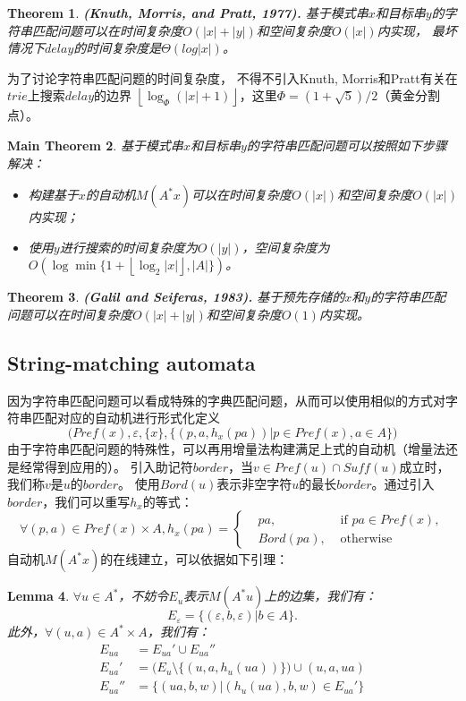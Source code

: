 \documentclass[UTF8]{ctexart}
\newtheorem{thm}{Theorem}[subsection]
\newtheorem{lem}[thm]{Lemma}
\newtheorem{mthm}[thm]{Main Theorem}
\theoremstyle{definition}
\theoremstyle{remark}
\numberwithin{equation}{subsection}
\newcommand\Emph{\textbf}
\newcommand{\resetcounter}{\setcounter{equation}{0}}
\begin{document}
	\begin{thm}
		\Emph{(Knuth, Morris, and Pratt, 1977).} 
		基于模式串$x$和目标串$y$的字符串匹配问题可以在时间复杂度$O(|x|+|y|)$和空间复杂度$O(|x|)$内实现，
		最坏情况下$delay$的时间复杂度是$\Theta(log|x|)$。
	\end{thm}
	为了讨论字符串匹配问题的时间复杂度，
	不得不引入Knuth, Morris和Pratt有关在$trie$上搜索$delay$的边界
	$\left\lfloor \log_\Phi(|x|+1) \right\rfloor$，这里$\Phi = (1+\sqrt5)/2$（黄金分割点）。
	
	\begin{mthm}
		基于模式串$x$和目标串$y$的字符串匹配问题可以按照如下步骤解决：
		\begin{itemize}
			\item 构建基于$x$的自动机$M(A^*x)$可以在时间复杂度$O(|x|)$和空间复杂度$O(|x|)$内实现；
			\item 使用$y$进行搜索的时间复杂度为$O(|y|)$，空间复杂度为$O(\log \min \{ 1+\left\lfloor \log_2|x| \right\rfloor, |A| \})$。
		\end{itemize}
	\end{mthm}
	\begin{thm}
		\Emph{(Galil and Seiferas, 1983).}
		基于预先存储的$x$和$y$的字符串匹配问题可以在时间复杂度$O(|x|+|y|)$和空间复杂度$O(1)$内实现。
	\end{thm}
	
\subsection{String-matching automata}

	因为字符串匹配问题可以看成特殊的字典匹配问题，从而可以使用相似的方式对字符串匹配对应的自动机进行形式化定义
	\[
		\Big( Pref(x), \varepsilon, \{x\}, \{(p, a, h_x(pa)) | p \in Pref(x), a \in A \} \Big)
	\]
	由于字符串匹配问题的特殊性，可以再用增量法构建满足上式的自动机（增量法还是经常得到应用的）。
	引入助记符$border$，当$v \in Pref(u) \cap Suff(u)$成立时，我们称$v$是$u$的$border$。
	使用$Bord(u)$表示非空字符$u$的最长$border$。通过引入$border$，我们可以重写$h_x$的等式：
	\[
		\forall (p,a) \in Pref(x) \times A, h_x(pa) = 
		\left\{
			\begin{aligned}
				&pa, 		&\text{ if } pa \in Pref(x),	\\
				&Bord(pa),	&\text{ otherwise }
			\end{aligned}
		\right .
	\]
	自动机$M(A^*x)$的在线建立，可以依据如下引理：
	\begin{lem}
		$\forall u \in A^*$，不妨令$E_u$表示$M(A^*u)$上的边集，我们有：
		\[
			E_\varepsilon = \{ (\varepsilon, b, \varepsilon) | b \in A \}.
		\]
		此外，$\forall (u,a) \in A^* \times A$，我们有：
		\resetcounter
		\begin{align}
			E_{ua} 	&= E_{ua}' \cup E_{ua}''		\\
			E_{ua}' &= \big( E_u \setminus \{(u,a,h_u(ua))\} \big) \cup {(u, a, ua)}	\\
			E_{ua}''&= \{ (ua,b,w) | (h_u(ua), b, w) \in E_{ua}' \}
		\end{align}
	\end{lem}
	
\end{document}
